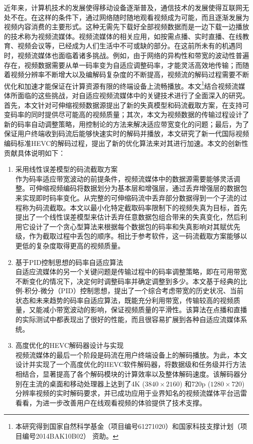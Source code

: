 \begin{cabstract}
近年来，计算机技术的发展使得移动设备逐渐普及，通信技术的发展使得互联网无处不在。在这样的条件下，通过网络随时随地观看视频成为可能，而且逐渐发展为视频内容消费的主要形式。这种无需先下载好全部视频数据而是一边下载一边播放的技术称为视频流媒体。视频流媒体的相关应用，如按需点播、实时直播、在线教育、视频会议等，已经成为人们生活中不可或缺的部分。在这前所未有的机遇同时，视频流媒体也面临着诸多挑战。例如，由于网络的异构性和带宽的波动性普遍存在，视频数据需要从单一码率变为自适应调整码率，才能灵活高效地传输；而随着视频分辨率不断增大以及编解码复杂度的不断提高，视频流的解码过程需要不断优化和加速才能保证在计算资源有限的终端设备上流畅播放。本文\footnote{本研究得到国家自然科学基金（项目编号61271020）和国家科技支撑计划（项目编号2014BAK10B02） 资助。}结合视频流媒体所面临的这些挑战，对自适应视频流媒体中的关键技术进行了全面深入的研究。首先，本文针对可伸缩视频数据源提出了新的失真模型和码流截取方案，在支持可变码率的同时提供尽可能高的视频质量；其次，本文为视频数据的传输过程设计了新的码率自动调整策略，用控制论的方法来解决适应带宽变化的问题；最后，为了保证用户终端收到码流后能够快速实时的解码并播放，本文研究了新一代国际视频编码标准HEVC的解码过程，提出了新的优化算法来对其进行加速。本文的创新性贡献具体说明如下：
\begin{enumerate}
\item {采用线性误差模型的码流截取方案}\\
作为码率适应带宽波动的前提条件，视频流媒体中的数据源需要能够灵活调整。可伸缩视频编码将数据划分为基本层和增强层，通过丢弃增强层的数据包来实现即时码率变化。从完整的可伸缩码流中丢弃部分数据得到一个子流的过程称为码流截取。本文以最小化特定截取码率限制下的视频失真为目标，首先提出了一个线性误差模型来估计丢弃任意数据包组合带来的失真变化，然后利用它设计了一个贪心型算法来根据每个数据包的码率和失真影响对其赋优先级，作为截取过程中丢包的顺序。相比于参考软件，这一码流截取方案能够以更低的复杂度取得更高的视频质量。
\item {基于PID控制思想的码率自适应算法}\\
自适应流媒体的另一个关键问题是传输过程中的码率调整策略，即在可用带宽不断变化的情况下，决定何时调整码率并确定调整到多少。本文基于经典的比例-积分-微分（PID）控制思想，提出了一个综合考虑带宽的历史状况、当前状态和未来趋势的码率自适应算法，既能充分利用带宽，传输较高的视频质量，又能减小带宽波动的影响，保证视频质量的平滑性。该算法在点播和直播的实际测试中都表现出了很好的性能，而且很容易扩展到各种自适应流媒体系统。
\item {高度优化的HEVC解码器设计与实现}\\
视频流媒体的最后一个阶段是码流在用户终端设备上的解码播放。为此，本文设计并实现了一个高度优化的HEVC软件解码器，将数据级和任务级并行方法相结合，显著提高了各个解码模块的计算效率以及整体解码速度。该解码器分别在主流的桌面和移动处理器上达到了4K ($3840 \times 2160$) 和720p ($1280 \times 720$) 分辨率视频的实时解码要求，并已成功应用于业界知名的视频流媒体平台迅雷看看，为进一步改善用户在线观看视频的体验提供了技术支撑。
\end{enumerate}
\end{cabstract}

